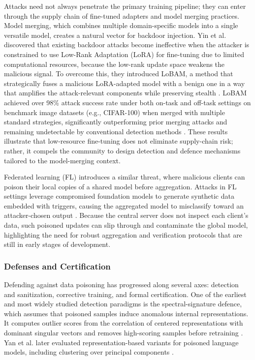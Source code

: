 \documentclass[11pt,a4paper]{article}
\begin{document}
Attacks need not always penetrate the primary training pipeline; they can enter through the supply chain of fine-tuned adapters and model merging practices. Model merging, which combines multiple domain-specific models into a single versatile model, creates a natural vector for backdoor injection. Yin et al. discovered that existing backdoor attacks become ineffective when the attacker is constrained to use Low-Rank Adaptation (LoRA) for fine-tuning due to limited computational resources, because the low-rank update space weakens the malicious signal. To overcome this, they introduced LoBAM, a method that strategically fuses a malicious LoRA-adapted model with a benign one in a way that amplifies the attack-relevant components while preserving stealth \cite{Yin_2024_LoRA_90edff2c}. LoBAM achieved over 98\% attack success rate under both on-task and off-task settings on benchmark image datasets (e.g., CIFAR-100) when merged with multiple standard strategies, significantly outperforming prior merging attacks and remaining undetectable by conventional detection methods \cite{Yin_2024_LoRA_90edff2c}. These results illustrate that low-resource fine-tuning does not eliminate supply-chain risk; rather, it compels the community to design detection and defence mechanisms tailored to the model-merging context.

Federated learning (FL) introduces a similar threat, where malicious clients can poison their local copies of a shared model before aggregation. Attacks in FL settings leverage compromised foundation models to generate synthetic data embedded with triggers, causing the aggregated model to misclassify toward an attacker-chosen output \cite{Mamun_2025_LLMs_7b0b92b0}. Because the central server does not inspect each client's data, such poisoned updates can slip through and contaminate the global model, highlighting the need for robust aggregation and verification protocols that are still in early stages of development.

\subsubsection{Defenses and Certification}

Defending against data poisoning has progressed along several axes: detection and sanitization, corrective training, and formal certification. One of the earliest and most widely studied detection paradigms is the spectral-signature defence, which assumes that poisoned samples induce anomalous internal representations. It computes outlier scores from the correlation of centered representations with dominant singular vectors and removes high-scoring samples before retraining \cite{Tran_2018_SpectralSignatures}. Yan et al. later evaluated representation-based variants for poisoned language models, including clustering over principal components \cite{Yan_2024_LLM_694cf462}.
\end{document}
